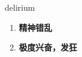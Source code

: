 
\begin{frame}
{\huge delirium}
\begin{center}
\begin{enumerate}\Large
  \item \textbf{精神错乱}
  \item \textbf{极度兴奋，发狂}
\end{enumerate}
\end{center}
\end{frame}
